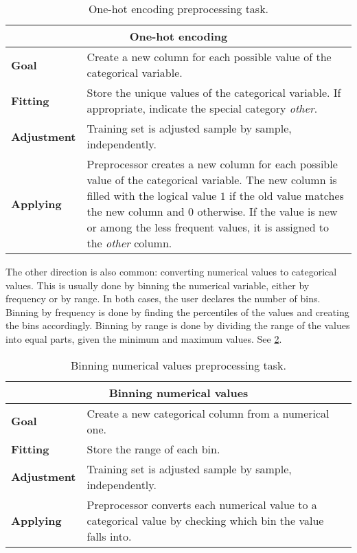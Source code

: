 \begin{table}\caption{One-hot encoding preprocessing task.}
  \centering
  \begin{tabular}{lp{6cm}}
    \toprule
    \multicolumn{2}{c}{\textbf{One-hot encoding}} \\
    \midrule
    \textbf{Goal} &
      Create a new column for each possible value of the categorical variable. \\
    \textbf{Fitting} &
      Store the unique values of the categorical variable.  If appropriate, indicate
      the special category \emph{other}.  \\
    \textbf{Adjustment} &
      Training set is adjusted sample by sample, independently. \\
    \textbf{Applying} &
      Preprocessor creates a new column for each possible value of the categorical
      variable.  The new column is filled with the logical value $1$ if the old value
      matches the new column and $0$ otherwise.  If the value is new or among the less
      frequent values, it is assigned to the \emph{other} column.  \\
    \bottomrule
  \end{tabular}
  \label{tab:one-hot}
\end{table}

The other direction is also common: converting numerical values to categorical values.
This is usually done by binning the numerical variable, either by frequency or by range.
In both cases, the user declares the number of bins.  Binning by frequency is done by
finding the percentiles of the values and creating the bins accordingly.  Binning by
range is done by dividing the range of the values into equal parts, given the minimum and
maximum values.  See \cref{tab:binning}.

\begin{table}\caption{Binning numerical values preprocessing task.}
  \centering
  \begin{tabular}{lp{6cm}}
    \toprule
    \multicolumn{2}{c}{\textbf{Binning numerical values}} \\
    \midrule
    \textbf{Goal} &
      Create a new categorical column from a numerical one.  \\
    \textbf{Fitting} &
      Store the range of each bin. \\
    \textbf{Adjustment} &
      Training set is adjusted sample by sample, independently. \\
    \textbf{Applying} &
      Preprocessor converts each numerical value to a categorical value by checking
      which bin the value falls into. \\
    \bottomrule
  \end{tabular}
  \label{tab:binning}
\end{table}

